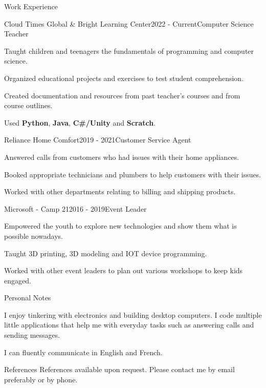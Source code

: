 \documentclass{resume}
\begin{document}
    \begin{rSection}{Work Experience}

        \begin{rSubsection}{Cloud Times Global \& Bright Learning Center}{2022 - Current}{Computer Science Teacher}{}
            \item Taught children and teenagers the fundamentals of programming and computer science.
            \item Organized educational projects and exercises to test student comprehension.
            \item Created documentation and resources from past teacher's courses and from course outlines.
            \item Used \textbf{Python}, \textbf{Java}, \textbf{C\#/Unity} and \textbf{Scratch}.
        \end{rSubsection}

        \begin{rSubsection}{Reliance Home Comfort}{2019 - 2021}{Customer Service Agent}{}
            \item Answered calls from customers who had issues with their home appliances.
            \item Booked appropriate technicians and plumbers to help customers with their issues.
            \item Worked with other departments relating to billing and shipping products.
        \end{rSubsection}

        \begin{rSubsection}{Microsoft - Camp 21}{2016 - 2019}{Event Leader}{}
            \item Empowered the youth to explore new technologies and show them what is possible nowadays.
            \item Taught 3D printing, 3D modeling and IOT device programming.
            \item Worked with other event leaders to plan out various workshops to keep kids engaged.
        \end{rSubsection}

    \end{rSection}

    \begin{rSection}{Personal Notes}
        \item I enjoy tinkering with electronics and building desktop computers.
        I code multiple little applications that help me with everyday tasks such
        as answering calls and sending messages.
        \item I can fluently communicate in English and French.
    \end{rSection}

    \begin{rSection}{References}
        References available upon request.
        Please contact me by email preferably or by phone.
    \end{rSection}
\end{document}
